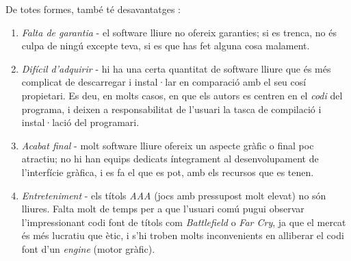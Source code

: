 De totes formes, també té desavantatges \cite{gentegeek}:

\begin{enumerate}
\item \emph{Falta de garantia} - el software lliure no ofereix garanties; si es trenca, no és culpa de ningú excepte teva, si es que has fet alguna cosa malament.
\item \emph{Difícil d'adquirir} - hi ha una certa quantitat de software lliure que és més complicat de descarregar i instal·lar en comparació amb el seu cosí propietari. Es deu, en molts casos, en que els autors es centren en el \emph{codi} del programa, i deixen a responsabilitat de l'usuari la tasca de compilació i instal·lació del programari.
\item \emph{Acabat final} - molt software lliure ofereix un aspecte gràfic o final poc atractiu; no hi han equips dedicats íntegrament al desenvolupament de l'interfície gràfica, i es fa el que es pot, amb els recursos que es tenen.
\item \emph{Entreteniment} - els títols \emph{AAA} (jocs amb pressupost molt elevat) no són lliures. Falta molt de temps per a que l'usuari comú pugui observar l'impressionant codi font de títols com \emph{Battlefield} o \emph{Far Cry}, ja que el mercat és més lucratiu que ètic, i s'hi troben molts inconvenients en alliberar el codi font d'un \emph{engine} (motor gràfic).
\end{enumerate}